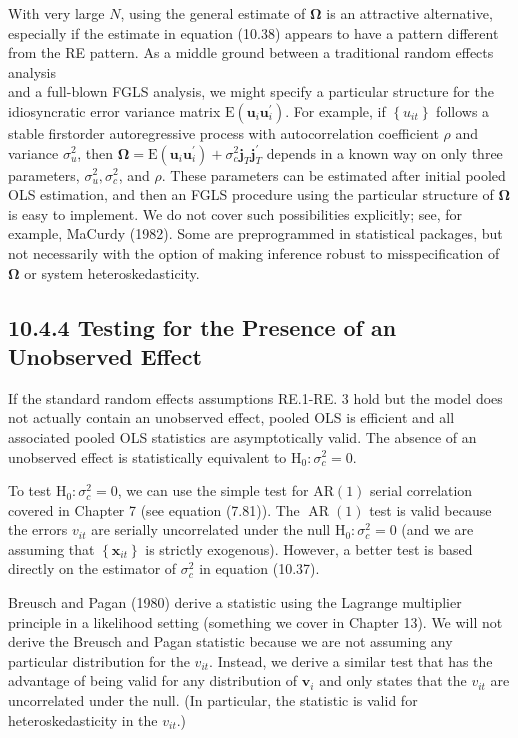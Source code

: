 \documentclass[10pt]{article}
\begin{document}
With very large $N$, using the general estimate of $\boldsymbol{\Omega}$ is an attractive alternative, especially if the estimate in equation (10.38) appears to have a pattern different from the RE pattern. As a middle ground between a traditional random effects analysis\\
and a full-blown FGLS analysis, we might specify a particular structure for the idiosyncratic error variance matrix $\mathrm{E}\left(\mathbf{u}_{i} \mathbf{u}_{i}^{\prime}\right)$. For example, if $\left\{u_{i t}\right\}$ follows a stable firstorder autoregressive process with autocorrelation coefficient $\rho$ and variance $\sigma_{u}^{2}$, then $\boldsymbol{\Omega}=\mathrm{E}\left(\mathbf{u}_{i} \mathbf{u}_{i}^{\prime}\right)+\sigma_{c}^{2} \mathbf{j}_{T} \mathbf{j}_{T}^{\prime}$ depends in a known way on only three parameters, $\sigma_{u}^{2}, \sigma_{c}^{2}$, and $\rho$. These parameters can be estimated after initial pooled OLS estimation, and then an FGLS procedure using the particular structure of $\boldsymbol{\Omega}$ is easy to implement. We do not cover such possibilities explicitly; see, for example, MaCurdy (1982). Some are preprogrammed in statistical packages, but not necessarily with the option of making inference robust to misspecification of $\boldsymbol{\Omega}$ or system heteroskedasticity.

\subsection*{10.4.4 Testing for the Presence of an Unobserved Effect}
If the standard random effects assumptions RE.1-RE. 3 hold but the model does not actually contain an unobserved effect, pooled OLS is efficient and all associated pooled OLS statistics are asymptotically valid. The absence of an unobserved effect is statistically equivalent to $\mathrm{H}_{0}: \sigma_{c}^{2}=0$.

To test $\mathrm{H}_{0}: \sigma_{c}^{2}=0$, we can use the simple test for $\mathrm{AR}(1)$ serial correlation covered in Chapter 7 (see equation (7.81)). The $\operatorname{AR}(1)$ test is valid because the errors $v_{i t}$ are serially uncorrelated under the null $\mathrm{H}_{0}: \sigma_{c}^{2}=0$ (and we are assuming that $\left\{\mathbf{x}_{i t}\right\}$ is strictly exogenous). However, a better test is based directly on the estimator of $\sigma_{c}^{2}$ in equation (10.37).

Breusch and Pagan (1980) derive a statistic using the Lagrange multiplier principle in a likelihood setting (something we cover in Chapter 13). We will not derive the Breusch and Pagan statistic because we are not assuming any particular distribution for the $v_{i t}$. Instead, we derive a similar test that has the advantage of being valid for any distribution of $\mathbf{v}_{i}$ and only states that the $v_{i t}$ are uncorrelated under the null. (In particular, the statistic is valid for heteroskedasticity in the $v_{i t}$.)
\end{document}
